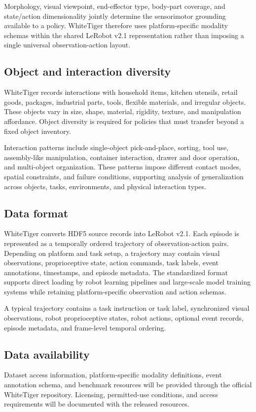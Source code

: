 Morphology, visual viewpoint, end-effector type, body-part coverage, and state/action dimensionality jointly determine the sensorimotor grounding available to a policy. WhiteTiger therefore uses platform-specific modality schemas within the shared LeRobot v2.1 representation rather than imposing a single universal observation-action layout.

\subsection{Object and interaction diversity}

WhiteTiger records interactions with household items, kitchen utensils, retail goods, packages, industrial parts, tools, flexible materials, and irregular objects. These objects vary in size, shape, material, rigidity, texture, and manipulation affordance. Object diversity is required for policies that must transfer beyond a fixed object inventory.

Interaction patterns include single-object pick-and-place, sorting, tool use, assembly-like manipulation, container interaction, drawer and door operation, and multi-object organization. These patterns impose different contact modes, spatial constraints, and failure conditions, supporting analysis of generalization across objects, tasks, environments, and physical interaction types.

\subsection{Data format}

WhiteTiger converts HDF5 source records into LeRobot v2.1. Each episode is represented as a temporally ordered trajectory of observation-action pairs. Depending on platform and task setup, a trajectory may contain visual observations, proprioceptive state, action commands, task labels, event annotations, timestamps, and episode metadata. The standardized format supports direct loading by robot learning pipelines and large-scale model training systems while retaining platform-specific observation and action schemas.

A typical trajectory contains a task instruction or task label, synchronized visual observations, robot proprioceptive states, robot actions, optional event records, episode metadata, and frame-level temporal ordering.

\subsection{Data availability}

Dataset access information, platform-specific modality definitions, event annotation schema, and benchmark resources will be provided through the official WhiteTiger repository. Licensing, permitted-use conditions, and access requirements will be documented with the released resources.